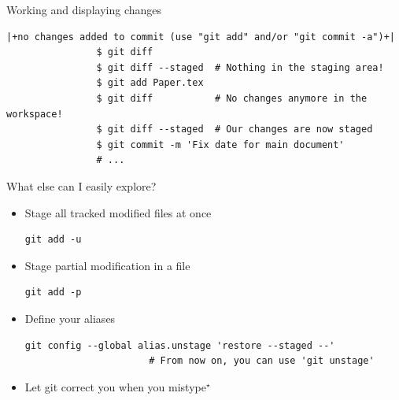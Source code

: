 \documentclass[usenames,svgnames,14pt]{beamer}
\begin{document}
\begin{frame}[fragile]{Working and displaying changes}
\begin{overlayarea}{\textwidth}{0.7\textheight}
\begin{onlyenv}
\begin{lstlisting}[style=MyBash, aboveskip=2mm, xleftmargin=-6mm, xrightmargin=-6mm]
                |+no changes added to commit (use "git add" and/or "git commit -a")+|
                $ git diff
                $ git diff --staged  # Nothing in the staging area!
                $ git add Paper.tex
                $ git diff           # No changes anymore in the workspace!
                $ git diff --staged  # Our changes are now staged
                $ git commit -m 'Fix date for main document'
                # ...
            \end{lstlisting}
        \end{onlyenv}
    \end{overlayarea}
\end{frame}
\begin{frame}[fragile]{What else can I easily explore?}
    \begin{itemize}
        \item Stage all tracked modified files at once\\[1mm]
              \begin{minipage}{\linewidth}
                  \begin{lstlisting}[style=MyBash]
                      git add -u
                  \end{lstlisting}
              \end{minipage}
        \item Stage partial modification in a file\\[1mm]
              \begin{minipage}{\linewidth}
                  \begin{lstlisting}[style=MyBash]
                      git add -p
                  \end{lstlisting}
              \end{minipage}
        \item Define your aliases\\[1mm]
              \begin{minipage}{\linewidth}
                  \begin{lstlisting}[style=MyBash]
                      git config --global alias.unstage 'restore --staged --'
                      # From now on, you can use 'git unstage'
                  \end{lstlisting}
              \end{minipage}
        \item Let git correct you when you mistype$^\star$\\[1mm]
              \begin{minipage}{\linewidth}

\end{minipage}
\end{itemize}
\end{frame}
\end{document}
